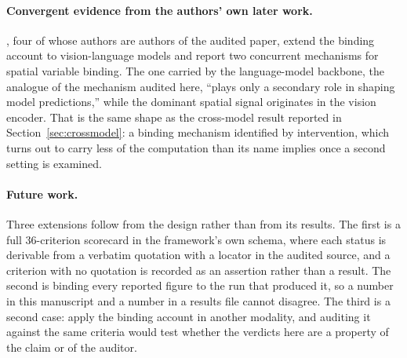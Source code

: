 \documentclass{article}
\begin{document}
\paragraph{Convergent evidence from the authors' own later work.}
\citet{cui2026dual}, four of whose authors are authors of the audited paper, extend the
binding account to vision-language models and report two concurrent mechanisms for spatial
variable binding. The one carried by the language-model backbone, the analogue of the
mechanism audited here, ``plays only a secondary role in shaping model predictions,'' while
the dominant spatial signal originates in the vision encoder. That is the same shape as the
cross-model result reported in Section~\ref{sec:crossmodel}: a binding mechanism identified
by intervention, which turns out to carry less of the computation than its name implies once
a second setting is examined.

\paragraph{Future work.}
Three extensions follow from the design rather than from its results. The first is a full
36-criterion scorecard in the framework's own schema, where each status is derivable from a
verbatim quotation with a locator in the audited source, and a criterion with no quotation is
recorded as an assertion rather than a result. The second is binding every reported figure to
the run that produced it, so a number in this manuscript and a number in a results file
cannot disagree. The third is a second case: \citet{cui2026dual} apply the
binding account in another modality, and auditing it against the same criteria would test
whether the verdicts here are a property of the claim or of the auditor.
\end{document}
